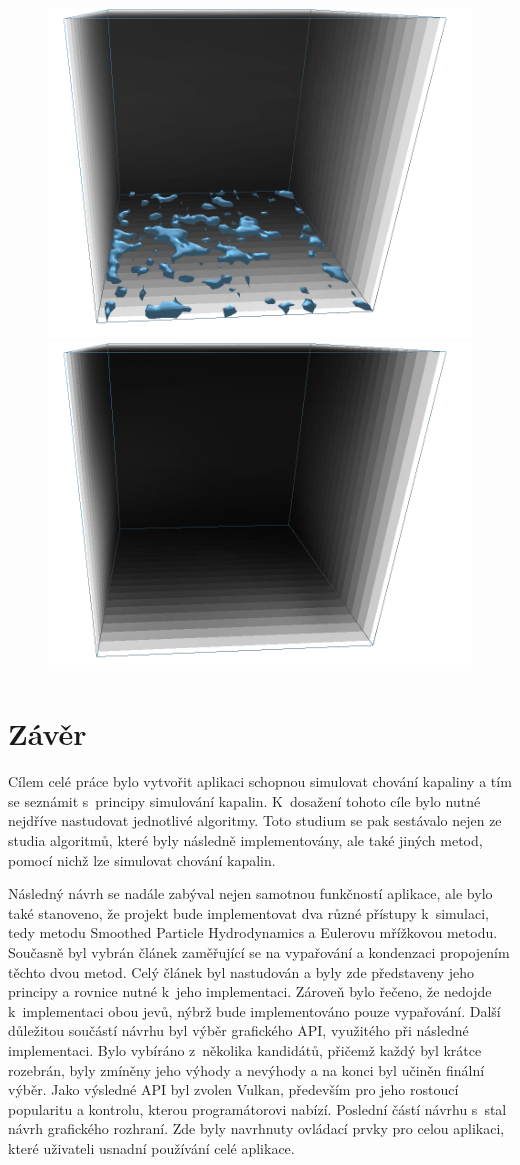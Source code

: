 \begin{figure}[h]
	\includegraphics[width=0.3\linewidth]{obrazky-figures/app/Evap07.jpg}
	\includegraphics[width=0.3\linewidth]{obrazky-figures/app/Evap08.jpg}\hfill
	\label{fig:SWE}
\end{figure}

\chapter{Závěr}
\label{chapter:zaver}

Cílem celé práce bylo vytvořit aplikaci schopnou simulovat chování kapaliny a tím se seznámit s~principy simulování kapalin. K~dosažení tohoto cíle bylo nutné nejdříve nastudovat jednotlivé algoritmy. Toto studium se pak sestávalo nejen ze studia algoritmů, které byly následně implementovány, ale také jiných metod, pomocí nichž lze simulovat chování kapalin.

Následný návrh se nadále zabýval nejen samotnou funkčností aplikace, ale bylo také stanoveno, že projekt bude implementovat dva různé přístupy k~simulaci, tedy metodu Smoothed Particle Hydrodynamics a Eulerovu mřížkovou metodu. Současně byl vybrán článek \cite{Evap&Cond} zaměřující se na vypařování a kondenzaci propojením těchto dvou metod. Celý článek byl nastudován a byly zde představeny jeho principy a rovnice nutné k~jeho implementaci. Zároveň bylo řečeno, že nedojde k~implementaci obou jevů, nýbrž bude implementováno pouze vypařování. Další důležitou součástí návrhu byl výběr grafického API, využitého při následné implementaci. Bylo vybíráno z~několika kandidátů, přičemž každý byl krátce rozebrán, byly zmíněny jeho výhody a nevýhody a na konci byl učiněn finální výběr. Jako výsledné API byl zvolen Vulkan, především pro jeho rostoucí popularitu a kontrolu, kterou programátorovi nabízí. Poslední částí návrhu s~stal návrh grafického rozhraní. Zde byly navrhnuty ovládací prvky pro celou aplikaci, které uživateli usnadní používání celé aplikace.


